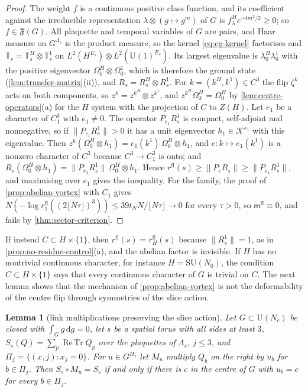 \documentclass[11pt,a4paper]{amsart}
\newtheorem{lemma}[theorem]{Lemma}
\theoremstyle{definition}
\theoremstyle{remark}
\numberwithin{equation}{section}
\DeclareMathOperator{\ReTr}{Re\,Tr}  %
\newcommand{\Kspace}{\mathcal{K}}    %
\newcommand{\Fclass}{\mathfrak{F}}   %
\newcommand{\norm}[1]{\lVert #1\rVert}     %
\newcommand{\dd}{\,\mathrm{d}}             %
\newcommand{\SU}{\mathrm{SU}}              %
\newcommand{\U}{\mathrm{U}}                %
\newcommand{\TT}{\mathbb{T}}               %
\newcommand{\cube}[1]{(2#1)^3}             %
\newcommand{\lzero}{\lambda_0}             %
\newcommand{\Omegazero}{\Omega_0}          %
\newcommand{\Mcirc}{\text{\upshape(M$^{\circ}$)}}   %
\begin{document}
\begin{proof}
The weight $f$ is a continuous positive class function, and its coefficient against the irreducible representation $\lambda\otimes(g\mapsto g^m)$ of $G$ is $f^H_\lambda e^{-tm^2/2}\ge0$; so $f\in\Fclass(G)$. All plaquette and temporal variables of $G$ are pairs, and Haar measure on $G^{\Lambda_s}$ is the product measure, so the kernel \eqref{eq:cg-kernel} factorises and $\TT_s=\TT^H_s\otimes\TT^1_s$ on $L^2(H^{E_s})\otimes L^2(\U(1)^{E_s})$. Its largest eigenvalue is $\lzero^H\lzero^1$ with the positive eigenvector $\Omegazero^H\otimes\Omegazero^1$, which is therefore the ground state (\cref{lem:transfer-matrix}(ii)), and $R_s=R^H_s\otimes R^1_s$. For $k=(k^H,k^1)\in C^3$ the flip $\zeta^k$ acts on both components, so $z^k=z^{k^H}\otimes z^{k^1}$, and $z^{k^H}\Omegazero^H=\Omegazero^H$ by \cref{lem:centre-operators}(a) for the $H$ system with the projection of $C$ to $Z(H)$. Let $e_1$ be a character of $C_1^3$ with $e_1\ne0$. The operator $P_{e_1}R^1_s$ is compact, self-adjoint and nonnegative, so if $\norm{P_{e_1}R^1_s}>0$ it has a unit eigenvector $h_1\in\Kspace^{e_1}$ with this eigenvalue. Then $z^k(\Omegazero^H\otimes h_1)=e_1(k^1)\,\Omegazero^H\otimes h_1$, and $e:k\mapsto e_1(k^1)$ is a nonzero character of $C^3$ because $C^3\to C_1^3$ is onto; and $R_s(\Omegazero^H\otimes h_1)=\norm{P_{e_1}R^1_s}\,\Omegazero^H\otimes h_1$. Hence $r^{\mathrm{fl}}(s)\ge\norm{P_eR_s}\ge\norm{P_{e_1}R^1_s}$, and maximising over $e_1$ gives the inequality. For the family, the proof of \cref{prop:abelian-vortex} with $C_1$ gives $N(-\log r^{\mathrm{fl}}_1(\cube{\lfloor N\tau\rfloor}))\le39t_NN/\lfloor N\tau\rfloor\to0$ for every $\tau>0$, so $\mathsf m^{\mathrm{fl}}\equiv0$, and \Mcirc{} fails by \cref{thm:sector-criterion}.
\end{proof}

If instead $C\subset H\times\{1\}$, then $r^{\mathrm{fl}}(s)=r^{\mathrm{fl}}_H(s)$ because $\norm{R^1_s}=1$, as in \cref{prop:no-residue-control}(a), and the abelian factor is invisible. If $H$ has no nontrivial continuous character, for instance $H=\SU(N_0)$, the condition $C\subset H\times\{1\}$ says that every continuous character of $G$ is trivial on $C$. The next lemma shows that the mechanism of \cref{prop:abelian-vortex} is not the deformability of the centre flip through symmetries of the slice action.

\begin{lemma}[link multiplications preserving the slice action]\label{lem:link-multiplications}
Let $G\subset\U(N_c)$ be closed with $\int_Gg\dd g=0$, let $s$ be a spatial torus with all sides at least $3$, $S_s(Q)=\sum_p\ReTr Q_p$ over the plaquettes of $\Lambda_s$, $j\le3$, and $\Pi_j=\{(x,j):x_j=0\}$. For $u\in G^{\Pi_j}$ let $M_u$ multiply $Q_b$ on the right by $u_b$ for $b\in\Pi_j$. Then $S_s\circ M_u=S_s$ if and only if there is $c$ in the centre of $G$ with $u_b=c$ for every $b\in\Pi_j$.
\end{lemma}
\end{document}
